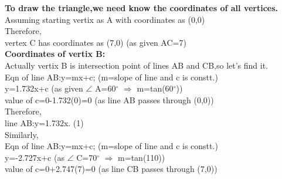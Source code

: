 \documentclass[a4paper,12pt]{article}
\begin{document}
\textbf{To draw the triangle,we need know the coordinates of all vertices.}\\

 Assuming starting vertix as A with coordinates as (0,0)\\

Therefore,\\
\hspace*{0.5cm} vertex C has coordinates as (7,0) \hspace*{3cm}(as given AC=7)\\

\textbf{Coordinates of vertix B:}\\

Actually vertix B is intersection point of lines AB and CB,so let's find it.\\

Eqn of line AB:y=mx+c;     \hspace*{2cm} (m=slope of line and c is constt.)\\

\hspace*{2.8cm}y=1.732x+c  \hspace*{2cm}  (as given $\angle$ A=60$^{\circ}$ $\Rightarrow$ m=tan(60$^{\circ}$))\\

\hspace*{0.5cm} value of c=0-1.732(0)=0 \hspace*{2cm}(as line AB passes through (0,0))\\

Therefore,\\

\hspace*{0.5cm}line AB:y=1.732x.  \hspace*{3cm}(1) \\

Similarly,\\

Eqn of line AB:y=mx+c;     \hspace*{2cm} (m=slope of line and c is constt.)\\

\hspace*{2.8cm}y=-2.727x+c  \hspace*{2cm}  (as  $\angle$ C=70$^{\circ}$ $\Rightarrow$ m=tan(110))\\

\hspace*{0.5cm} value of c=0+2.747(7)=0 \hspace*{2cm}(as line CB passes through (7,0))\\
\end{document}
